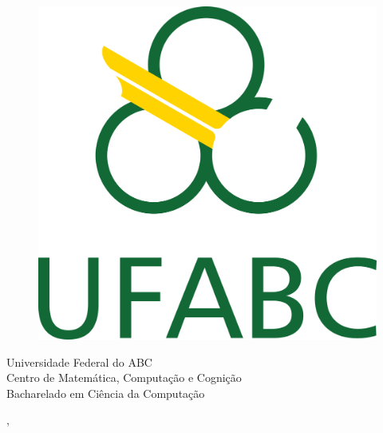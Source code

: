 \begin{capa}%
  \begin{figure}[h!]%
    \centering%
    \includegraphics[scale=1.2]{figs/logo.png}%
  \end{figure}%
  \center \ABNTEXchapterfont\large{Universidade Federal do ABC
    \\ Centro de Matemática, Computação e Cognição \\ Bacharelado em
  Ciência da Computação}

  \vfill
  \ABNTEXchapterfont\bfseries\LARGE\imprimirtitulo
  \vfill

  \ABNTEXchapterfont\large\imprimirautor
  \vfill

  \large\imprimirlocal, \large\imprimirdata

  \vspace*{1cm}
\end{capa}
